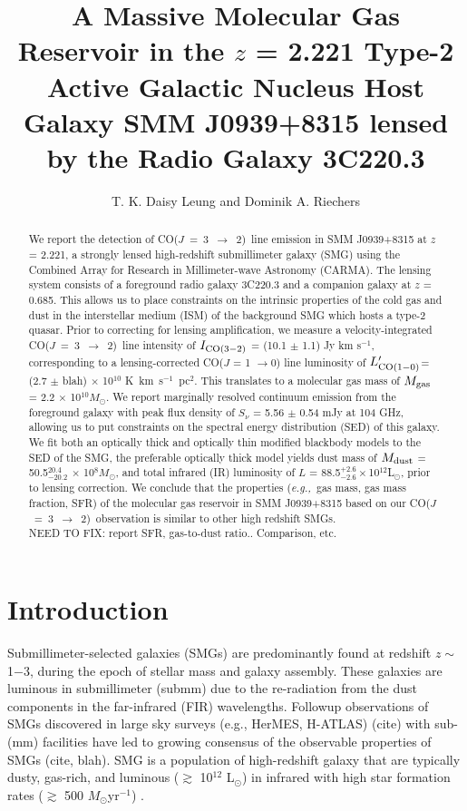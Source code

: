 \documentclass[twocolumn,apj,numberedappendix]{emulateapj}
\newcommand{\Msun}{\mbox{$M_{\odot}$}}
\newcommand{\Lsun}{\mbox{L$_{\odot}$}}
\newcommand{\rarr}{$\rightarrow$}
\newcommand{\CO}{\mbox{CO($J$ = 3 $\rightarrow$ 2) }}
\newcommand{\Lp}{\mbox{$L^{\prime}_{\rm CO(1-0)}$}}
\newcommand{\LpU}{\mbox{K km s$^{-1}$ pc$^2$}}
\newcommand{\eg}{{\sl e.g.,~}}
\newcommand{\pmOne}{$^{-1}$}
\begin{document}
\title{A Massive Molecular Gas Reservoir in the $z$ = 2.221 Type-2 Active Galactic Nucleus Host Galaxy SMM J0939+8315 lensed by the Radio Galaxy 3C220.3}
\author{T. K. Daisy Leung and Dominik A. Riechers}

\begin{abstract}
We report the detection of \CO line emission in SMM J0939+8315 at $z$ = 2.221, a
strongly lensed high-redshift submillimeter galaxy (SMG) using
the Combined Array for Research in Millimeter-wave Astronomy (CARMA). The lensing system consists of a
foreground radio galaxy 3C220.3 and a companion galaxy at $z$ = 0.685. This allows us to place constraints on the intrinsic properties
of the cold gas and dust in the interstellar medium (ISM) of the background SMG which hosts a type-2 quasar. Prior to correcting for lensing 
amplification, we measure a velocity-integrated \CO line intensity of $I_{\rm CO(3-2)}$ = (10.1 $\pm$ 1.1) Jy km s\pmOne,
corresponding to a lensing-corrected CO($J$ = 1 \rarr 0) line luminosity of \Lp = (2.7 $\pm$ 
blah) $\times$ 10$^{10}$ \LpU. This
translates to a molecular gas mass of $M_{\rm gas}$ = 2.2 $\times$ 10$^{10}M_\odot$. We report marginally resolved continuum 
emission from the foreground galaxy with peak flux density of $S_\nu$ = 5.56 $\pm$ 0.54 mJy
 at 104 GHz, allowing us to put constraints on the spectral energy distribution (SED) of this galaxy. We 
fit
 both an optically thick and optically thin modified blackbody models to the SED of the SMG, the preferable optically thick model  yields dust mass of $M_{\rm
dust}$ = 50.5$^{20.4}_{-20.2}$ $\times$ 10$^8$\Msun, and total infrared (IR) luminosity of $L$ = 88.5$^{+2.6}
_{-2.6}\times$10$^{12}$\Lsun, prior to lensing correction. We conclude that the properties (\eg gas mass, gas mass 
fraction, SFR) of the molecular gas reservoir in SMM
J0939+8315 based on our \CO observation is similar to other high redshift
SMGs. \\
NEED TO  FIX: 
report SFR, gas-to-dust ratio.. Comparison, etc. 
\end{abstract}

\section{Introduction}\label{sec:intro}
Submillimeter-selected galaxies (SMGs) are predominantly found at redshift $z \sim$ 1$-$3, during the epoch of stellar mass and 
galaxy assembly. These galaxies are luminous in submillimeter (submm) due to the re-radiation from the dust components in the
 far-infrared (FIR) wavelengths. Followup observations of SMGs discovered in large sky surveys (e.g., HerMES, H-ATLAS) (cite) with sub-(mm) facilities have led to growing consensus
  of the observable properties of SMGs (cite, blah). SMG is a population of high-redshift galaxy that are typically dusty, gas-rich, 
  and luminous ($\gtrsim$ 10$^{12}$ \Lsun) in infrared with high star formation rates ($\gtrsim $ 500 \Msun yr\pmOne) \citep[\eg][]{Lagache05a}.
  
\end{document}
